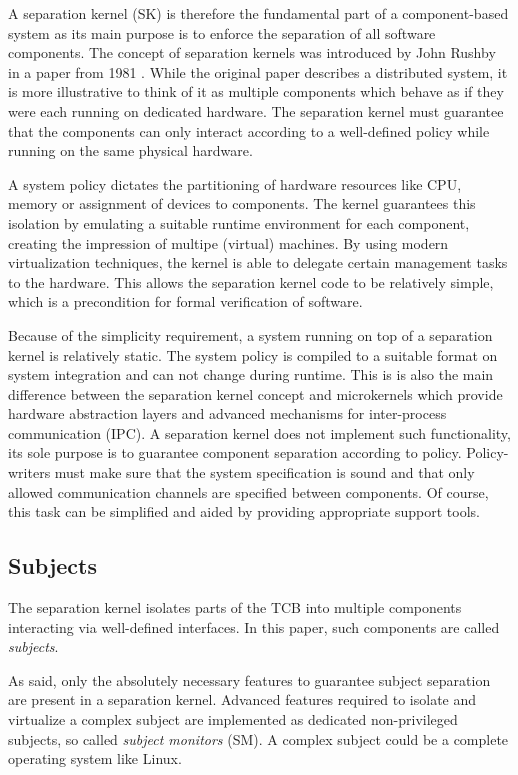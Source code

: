 A separation kernel (SK) is therefore the fundamental
part of a component-based system as its main purpose is to enforce the
separation of all software components. The concept of separation kernels was
introduced by John Rushby in a paper from 1981 \cite{rushby1981}. While the
original paper describes a distributed system, it is more illustrative to think
of it as multiple components which behave as if they were each running on
dedicated hardware. The separation kernel must guarantee that the components
can only interact according to a well-defined policy while running on the same
physical hardware.

A system policy dictates the partitioning of hardware resources like CPU,
memory or assignment of devices to components. The kernel guarantees this
isolation by emulating a suitable runtime environment for each component,
creating the impression of multipe (virtual) machines. By using modern
virtualization techniques, the kernel is able to delegate certain management
tasks to the hardware. This allows the separation kernel code to be relatively
simple, which is a precondition for formal verification of software.

Because of the simplicity requirement, a system running on top of a separation
kernel is relatively static. The system policy is compiled to a suitable format
on system integration and can not change during runtime. This is is also the
main difference between the separation kernel concept and microkernels which
provide hardware abstraction layers and advanced mechanisms for inter-process
communication (IPC). A separation kernel does not implement such
functionality, its sole purpose is to guarantee component separation according
to policy. Policy-writers must make sure that the system specification is sound
and that only allowed communication channels are specified between components.
Of course, this task can be simplified and aided by providing appropriate
support tools.

\subsection{Subjects}
The separation kernel isolates parts of the TCB into multiple
components interacting via well-defined interfaces. In this
paper, such components are called \emph{subjects}.

As said, only the absolutely necessary features to guarantee subject separation
are present in a separation kernel. Advanced features required to isolate and
virtualize a complex subject are implemented as dedicated non-privileged
subjects, so called \emph{subject monitors} (SM). A complex subject
could be a complete operating system like Linux.

